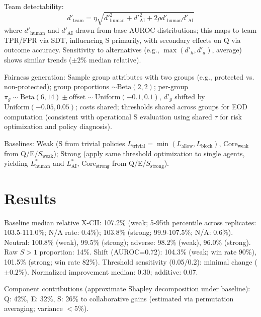 \documentclass[a4paper]{article}
\begin{document}
Team detectability: 
\[
d'_{\text{team}} = \eta \sqrt{d'^{2}_{\text{human}} + d'^{2}_{\text{AI}} + 2\rho d'_{\text{human}} d'_{\text{AI}}}
\]
where $d'_{\text{human}}$ and $d'_{\text{AI}}$ drawn from base AUROC distributions; this maps to team TPR/FPR via SDT, influencing S primarily, with secondary effects on Q via outcome accuracy. Sensitivity to alternatives (e.g., $\max(d'_{h}, d'_{a})$, average) shows similar trends ($\pm2\%$ median relative).

Fairness generation: Sample group attributes with two groups (e.g., protected vs. non-protected); group proportions $\sim \text{Beta}(2,2)$; per-group $\pi_g \sim \text{Beta}(6,14) \pm \text{offset} \sim \text{Uniform}(-0.1,0.1)$, $d'_g$ shifted by $\text{Uniform}(-0.05,0.05)$; costs shared; thresholds shared across groups for EOD computation (consistent with operational S evaluation using shared $\tau$ for risk optimization and policy diagnosis).

Baselines: Weak (S from trivial policies $L_{\text{trivial}} = \min(L_{\text{allow}}, L_{\text{block}})$, $\text{Core}_{\text{weak}}$ from Q/E/$S_{\text{weak}}$); Strong (apply same threshold optimization to single agents, yielding $L^*_{\text{human}}$ and $L^*_{\text{AI}}$, $\text{Core}_{\text{strong}}$ from Q/E/$S_{\text{strong}}$).

\section{Results}

Baseline median relative X-CII: 107.2\% (weak; 5-95th percentile across replicates: 103.5-111.0\%; N/A rate: 0.4\%); 103.8\% (strong; 99.9-107.5\%; N/A: 0.6\%). Neutral: 100.8\% (weak), 99.5\% (strong); adverse: 98.2\% (weak), 96.0\% (strong). Raw $S>1$ proportion: 14\%. Shift (AUROC=0.72): 104.3\% (weak; win rate 90\%), 101.5\% (strong; win rate 82\%). Threshold sensitivity (0.05/0.2): minimal change ($\pm0.2\%$). Normalized improvement median: 0.30; additive: 0.07.

Component contributions (approximate Shapley decomposition under baseline): Q: 42\%, E: 32\%, S: 26\% to collaborative gains (estimated via permutation averaging; variance $<5\%$).
\end{document}
